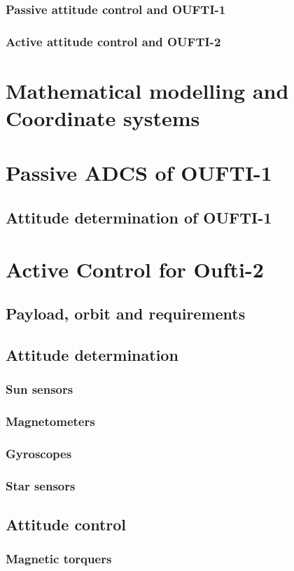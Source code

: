 \documentclass[10pt]{article}
\begin{document}
\subsubsection{Passive attitude control and OUFTI-1}
\subsubsection{Active attitude control and OUFTI-2}
\section{Mathematical modelling and Coordinate systems}
\section{Passive ADCS of OUFTI-1}
\subsection{Attitude determination of OUFTI-1}
\section{Active Control for Oufti-2}
\subsection{Payload, orbit and requirements}
\subsection{Attitude determination}
\subsubsection{Sun sensors}
\subsubsection{Magnetometers}
\subsubsection{Gyroscopes}
\subsubsection{Star sensors}
\subsection{Attitude control}
\subsubsection{Magnetic torquers}
\end{document}
